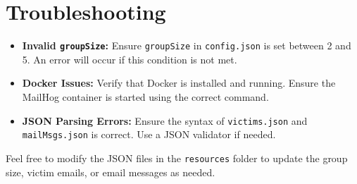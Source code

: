 \documentclass[a4paper,12pt]{article}
\begin{document}
\section*{Troubleshooting}
\begin{itemize}
    \item \textbf{Invalid \texttt{groupSize}:} Ensure \texttt{groupSize} in \texttt{config.json} is set between 2 and 5. An error will occur if this condition is not met.
    \item \textbf{Docker Issues:} Verify that Docker is installed and running. Ensure the MailHog container is started using the correct command.
    \item \textbf{JSON Parsing Errors:} Ensure the syntax of \texttt{victims.json} and \texttt{mailMsgs.json} is correct. Use a JSON validator if needed.
\end{itemize}

\noindent Feel free to modify the JSON files in the \texttt{resources} folder to update the group size, victim emails, or email messages as needed.
\end{document}
